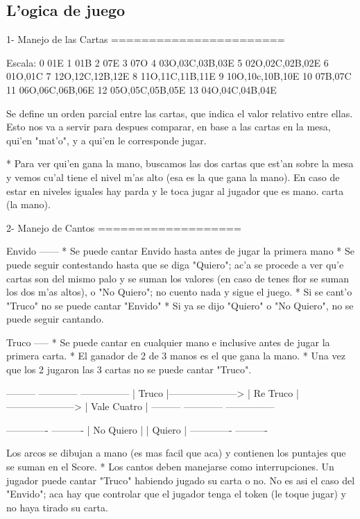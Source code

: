 \subsection{L'ogica de juego}

1- Manejo de las Cartas
=======================

Escala:
0 01E
1 01B
2 07E
3 07O
4 03O,03C,03B,03E
5 02O,02C,02B,02E
6 01O,01C
7 12O,12C,12B,12E
8 11O,11C,11B,11E
9 10O,10c,10B,10E
10  07B,07C
11  06O,06C,06B,06E
12  05O,05C,05B,05E
13  04O,04C,04B,04E

  Se define un orden parcial entre las cartas, que indica el valor relativo entre ellas. Esto nos va a servir para despues comparar, en base a las cartas en la mesa, qui'en "mat'o", y a qui'en le corresponde jugar.

  * Para ver qui'en gana la mano, buscamos las dos cartas que est'an sobre la mesa y vemos cu'al tiene el nivel m'as alto (esa es la que gana la mano). En caso de estar en niveles iguales hay parda y le toca jugar al jugador que es mano.
carta (la mano).


2- Manejo de Cantos
===================

Envido
------
  * Se puede cantar Envido hasta antes de jugar la primera mano
  * Se puede seguir contestando hasta que se diga "Quiero"; ac'a se procede a ver qu'e cartas son del mismo palo y se suman los valores (en caso de tenes flor se suman los dos m'as altos), o "No Quiero"; no cuento nada y sigue el juego.
  * Si se cant'o "Truco" no se puede cantar "Envido"
  * Si ya se dijo "Quiero" o "No Quiero", no se puede seguir cantando.

Truco
-----
  * Se puede cantar en cualquier mano e inclusive antes de jugar la primera carta.
  * El ganador de 2 de 3 manos es el que gana la mano.
  * Una vez que los 2 jugaron las 3 cartas no se puede cantar "Truco".

      ---------                       ------------                       ---------------
      | Truco |---------------------> | Re Truco |---------------------> | Vale Cuatro |
      ---------                       ------------                       ---------------



        -------------          ----------
        | No Quiero |          | Quiero |
        -------------          ----------

  Los arcos se dibujan a mano (es mas facil que aca) y contienen los puntajes que se suman en el Score.
* Los cantos deben manejarse como interrupciones. Un jugador puede cantar "Truco" habiendo jugado su carta o no. No es asi el caso del "Envido"; aca hay que controlar que el jugador tenga el token (le toque jugar) y no haya tirado su carta.


